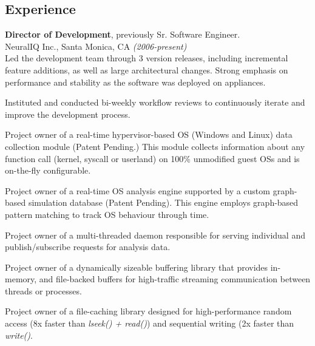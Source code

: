 \documentclass[margin]{res}
\begin{document}
\begin{resume}
\section{Experience}
\noindent
{\bf Director of Development}, previously Sr. Software Engineer. \\
NeuralIQ Inc., Santa Monica, CA {\em (2006-present)} \\

 Led the development team through 3 version releases, including
 incremental feature additions, as well as large architectural
 changes.  Strong emphasis on performance and stability as the
 software was deployed on appliances.

 Instituted and conducted bi-weekly workflow reviews to continuously
 iterate and improve the development process.

 Project owner of a real-time hypervisor-based OS (Windows and Linux)
 data collection module (Patent Pending.)  This module collects
 information about any function call (kernel, syscall or userland) on
 100\% unmodified guest OSs and is on-the-fly configurable.

 Project owner of a real-time OS analysis engine supported by a custom
 graph-based simulation database (Patent Pending).  This engine
 employs graph-based pattern matching to track OS behaviour through
 time.

 Project owner of a multi-threaded daemon responsible for serving
 individual and publish/subscribe requests for analysis data.

 Project owner of a dynamically sizeable buffering library that
 provides in-memory, and file-backed buffers for high-traffic
 streaming communication between threads or processes.

 Project owner of a file-caching library designed for high-performance
 random access (8x faster than {\em lseek() + read()}) and sequential
 writing (2x faster than {\em write()}.


\end{resume}
\end{document}
